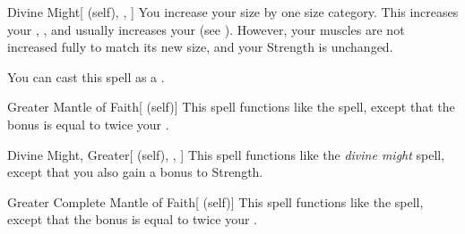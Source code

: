 \lowercase{\hypertarget{spell:Divine Might}{}}\label{spell:Divine Might}
\begin{attuneability}[\nth{3}]{\hypertarget{spell:Divine Might}{Divine Might}}[ (self), , ]
You increase your size by one size category.
This increases your , , and usually increases your  (see ).
However, your muscles are not increased fully to match its new size, and your Strength is unchanged.

You can cast this spell as a .
\end{attuneability}
\vspace{0.25em}



\lowercase{\hypertarget{spell:Greater Mantle of Faith}{}}\label{spell:Greater Mantle of Faith}
\begin{attuneability}[\nth{4}]{\hypertarget{spell:Greater Mantle of Faith}{Greater Mantle of Faith}}[ (self)]
This spell functions like the  spell, except that the bonus is equal to twice your .
\end{attuneability}
\vspace{0.25em}



\lowercase{\hypertarget{spell:Divine Might, Greater}{}}\label{spell:Divine Might, Greater}
\begin{attuneability}[\nth{5}]{\hypertarget{spell:Divine Might, Greater}{Divine Might, Greater}}[ (self), , ]
This spell functions like the \textit{divine might} spell, except that you also gain a  bonus to Strength.
\end{attuneability}
\vspace{0.25em}



\lowercase{\hypertarget{spell:Greater Complete Mantle of Faith}{}}\label{spell:Greater Complete Mantle of Faith}
\begin{attuneability}[\nth{5}]{\hypertarget{spell:Greater Complete Mantle of Faith}{Greater Complete Mantle of Faith}}[ (self)]
This spell functions like the  spell, except that the bonus is equal to twice your .
\end{attuneability}
\vspace{0.25em}



